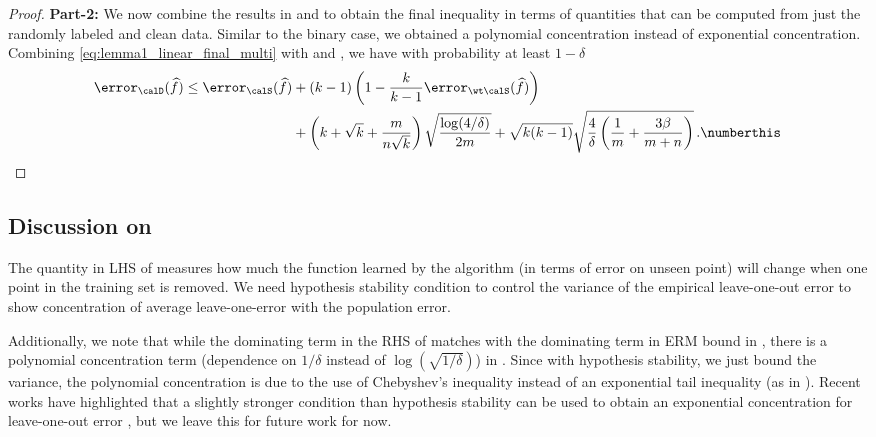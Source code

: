 \begin{proof}
    \textbf{Part-2:} We now combine the results in  and  to obtain the final inequality in terms of quantities that can be computed from just the randomly labeled and clean data. Similar to the binary case, we obtained a polynomial concentration instead of exponential concentration. Combining \eqref{eq:lemma1_linear_final_multi} with  and , we have with probability at least $1-\delta$
    \begin{align*}
        \error_\calD(\widehat f) \le \error_\calS(\widehat f) &+ (k-1)\left(1 - \frac{k}{k-1} \error_{\wt\calS}(\widehat f) \right) \\ &+ \left(k + \sqrt{k} + \frac{m}{n\sqrt{k}} \right) \sqrt{\frac{\log(4/\delta)}{2m}} + \sqrt{k(k-1)} \sqrt{\frac{4}{\delta}\left(\frac{1}{m} +\frac{3\beta}{m+n} \right)}  \,. \numberthis \label{eq:gd_multi_error_proof}
    \end{align*} 
\end{proof}

\subsection{Discussion on } \label{app:discuss_cond1}
The quantity in LHS of  
measures how much the function learned by the algorithm 
(in terms of error on unseen point) will change 
when one point in the training set is removed. 
We need hypothesis stability condition 
to control the variance of the empirical leave-one-out error to show concentration of average leave-one-error with the population error. 

Additionally, we note that while the dominating term in the RHS of  matches with the dominating term in ERM bound in , there is a polynomial concentration term 
(dependence on $1/\delta$ instead of $\log(\sqrt{1/\delta})$) 
in . 
Since with hypothesis stability, 
we just bound the variance, 
the polynomial concentration is due 
to the use of Chebyshev's inequality 
instead of an exponential tail inequality
(as in ).
Recent works have highlighted that 
a slightly stronger condition than hypothesis stability 
can be used to obtain an exponential concentration 
for leave-one-out error \citep{abou2019exponential},
but we leave this for future work for now. 

